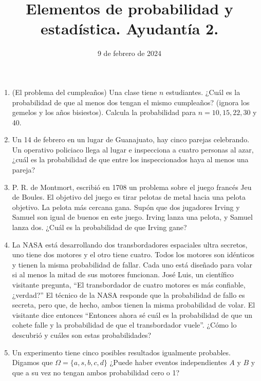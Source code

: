 \documentclass{article}
\title{Elementos de probabilidad y estadística. Ayudantía 2.}
\date{9 de febrero de 2024}
\begin{document}
\maketitle


\begin{enumerate}
    \item (El problema del cumpleaños) Una clase tiene $n$ estudiantes. ¿Cuál es la
    probabilidad de que al menos dos tengan el mismo cumpleaños? (ignora los gemelos
    y los años bisiestos). Calcula la probabilidad para $n=10,15,22,30$ y 40.

    \item Un 14 de febrero en un lugar de Guanajuato, hay cinco parejas celebrando.
    Un operativo policiaco llega al lugar e inspecciona a cuatro personas al azar,
    ¿cuál es la probabilidad de que entre los inspeccionados haya al menos una pareja?

    \item P. R. de Montmort, escribió en 1708 un problema sobre el juego francés
    Jeu de Boules.  El objetivo del juego es  tirar pelotas de metal hacia una pelota 
    objetivo.  La pelota más cercana gana.  Supón que dos jugadores Irving y Samuel son igual
    de buenos en este juego. Irving lanza una pelota, y Samuel lanza dos. ¿Cuál es la
    probabilidad de que Irving gane?

    \item La NASA está desarrollando dos transbordadores espaciales ultra secretos,
    uno tiene dos motores y el otro tiene cuatro.  Todos los motores son idénticos 
    y tienen la misma probabilidad de fallar.  Cada uno está diseñado para volar si 
    al menos la mitad de sus motores funcionan.  José Luis, un científico visitante pregunta,
    ``El transbordador de cuatro motores es más confiable, ¿verdad?'' El técnico de
    la NASA responde que la probabilidad de fallo es secreta, pero que, de hecho, 
    ambos tienen la misma probabilidad de volar. El visitante dice entonces ``Entonces
    ahora sé cuál es la probabilidad de que un cohete falle y la probabilidad de que
    el transbordador vuele''. ¿Cómo lo descubrió y cuáles son estas probabilidades?

    \item Un experimento tiene cinco posibles resultados igualmente probables. Digamos que $\Omega=\{a,s,b,c,d\}$
    ¿Puede haber eventos independientes $A$ y $B$ y que a su vez no tengan ambos probabilidad cero o 1?

\end{enumerate}
\end{document}
